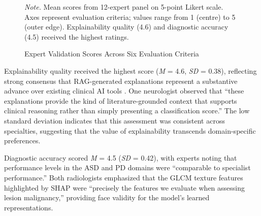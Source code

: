 \begin{figure}[H]
\caption{Expert Validation Scores Across Six Evaluation Criteria}
\label{fig:expert_radar}
\vspace{0.5em}\noindent\textit{Note.} Mean scores from 12-expert panel on 5-point Likert scale. Axes represent evaluation criteria; values range from 1 (centre) to 5 (outer edge). Explainability quality (4.6) and diagnostic accuracy (4.5) received the highest ratings.
\end{figure}

Explainability quality received the highest score (\textit{M} = 4.6, \textit{SD} = 0.38), reflecting strong consensus that RAG-generated explanations represent a substantive advance over existing clinical AI tools \citep{arrieta2020xai}. One neurologist observed that ``these explanations provide the kind of literature-grounded context that supports clinical reasoning rather than simply presenting a classification score.'' The low standard deviation indicates that this assessment was consistent across specialties, suggesting that the value of explainability transcends domain-specific preferences.

Diagnostic accuracy scored \textit{M} = 4.5 (\textit{SD} = 0.42), with experts noting that performance levels in the ASD and PD domains were ``comparable to specialist performance.'' Both radiologists emphasized that the GLCM texture features highlighted by SHAP were ``precisely the features we evaluate when assessing lesion malignancy,'' providing face validity for the model's learned representations.


